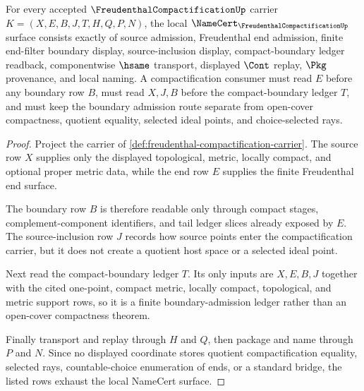 \begin{theorem}
\label{thm:freudenthal-compactification-namecert-obligation-surface}
For every accepted $\FreudenthalCompactificationUp$ carrier $K=(X,E,B,J,T,H,Q,P,N)$, the local $\NameCert_{\FreudenthalCompactificationUp}$ surface consists exactly of source admission, Freudenthal end admission, finite end-filter boundary display, source-inclusion display, compact-boundary ledger readback, componentwise $\hsame$ transport, displayed $\Cont$ replay, $\Pkg$ provenance, and local naming. A compactification consumer must read $E$ before any boundary row $B$, must read $X,J,B$ before the compact-boundary ledger $T$, and must keep the boundary admission route separate from open-cover compactness, quotient equality, selected ideal points, and choice-selected rays.
\end{theorem}
\begin{proof}
Project the carrier of \autoref{def:freudenthal-compactification-carrier}. The source row $X$ supplies only the displayed topological, metric, locally compact, and optional proper metric data, while the end row $E$ supplies the finite Freudenthal end surface.

The boundary row $B$ is therefore readable only through compact stages, complement-component identifiers, and tail ledger slices already exposed by $E$. The source-inclusion row $J$ records how source points enter the compactification carrier, but it does not create a quotient host space or a selected ideal point.

Next read the compact-boundary ledger $T$. Its only inputs are $X,E,B,J$ together with the cited one-point, compact metric, locally compact, topological, and metric support rows, so it is a finite boundary-admission ledger rather than an open-cover compactness theorem.

Finally transport and replay through $H$ and $Q$, then package and name through $P$ and $N$. Since no displayed coordinate stores quotient compactification equality, selected rays, countable-choice enumeration of ends, or a standard bridge, the listed rows exhaust the local NameCert surface.
\end{proof}


